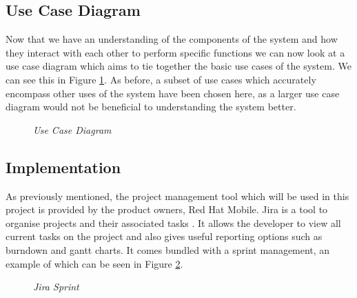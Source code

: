 \subsection{Use Case Diagram}

Now that we have an understanding of the components of the system and how they interact with each other to perform specific functions we can now look at a use case diagram which aims to tie together the basic use cases of the system. We can see this in Figure \ref{fig:use_case_diagram}. As before, a subset of use cases which accurately encompass other uses of the system have been chosen here, as a larger use case diagram would not be beneficial to understanding the system better. 

\begin{figure}[!ht]
\centering
{}
\caption{\em Use Case Diagram}
\label{fig:use_case_diagram}
\end{figure}

\newpage
\subsection{Implementation}
As previously mentioned, the project management tool which will be used in this project is provided by the product owners, Red Hat Mobile. Jira is a tool to organise projects and their associated tasks \citep{JBoss2016}. It allows the developer to view all current tasks on the project and also gives useful reporting options such as burndown and gantt charts. It comes bundled with a sprint management, an example of which can be seen in Figure \ref{fig:jira}.

\begin{figure}[!ht]
\centering
{}
\caption{\em Jira Sprint}
\label{fig:jira}
\end{figure}

